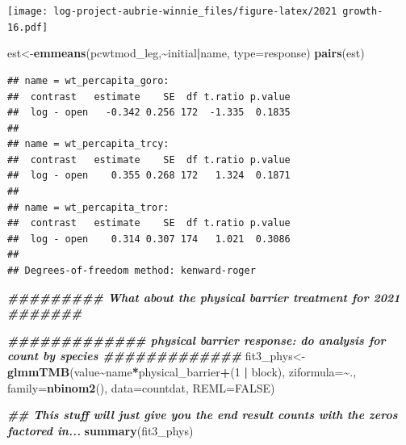 \documentclass[
]{article}
\newenvironment{Shaded}{\begin{snugshade}}{\end{snugshade}}
\newcommand{\AttributeTok}[1]{\textcolor[rgb]{0.13,0.29,0.53}{#1}}
\newcommand{\ConstantTok}[1]{\textcolor[rgb]{0.56,0.35,0.01}{#1}}
\newcommand{\DecValTok}[1]{\textcolor[rgb]{0.00,0.00,0.81}{#1}}
\newcommand{\DocumentationTok}[1]{\textcolor[rgb]{0.56,0.35,0.01}{\textbf{\textit{#1}}}}
\newcommand{\FunctionTok}[1]{\textcolor[rgb]{0.13,0.29,0.53}{\textbf{#1}}}
\newcommand{\NormalTok}[1]{#1}
\newcommand{\OtherTok}[1]{\textcolor[rgb]{0.56,0.35,0.01}{#1}}
\newcommand{\SpecialCharTok}[1]{\textcolor[rgb]{0.81,0.36,0.00}{\textbf{#1}}}
\newcommand{\StringTok}[1]{\textcolor[rgb]{0.31,0.60,0.02}{#1}}
\begin{document}
\texttt{[image: log-project-aubrie-winnie\_files/figure-latex/2021 growth-16.pdf]}

\begin{Shaded}
\begin{Highlighting}[]
\NormalTok{est}\OtherTok{\textless{}{-}}\FunctionTok{emmeans}\NormalTok{(pcwtmod\_leg,}\SpecialCharTok{\textasciitilde{}}\NormalTok{initial}\SpecialCharTok{|}\NormalTok{name, }\AttributeTok{type=}\StringTok{\textquotesingle{}response\textquotesingle{}}\NormalTok{)}
\FunctionTok{pairs}\NormalTok{(est)}
\end{Highlighting}
\end{Shaded}

\begin{verbatim}
## name = wt_percapita_goro:
##  contrast   estimate    SE  df t.ratio p.value
##  log - open   -0.342 0.256 172  -1.335  0.1835
## 
## name = wt_percapita_trcy:
##  contrast   estimate    SE  df t.ratio p.value
##  log - open    0.355 0.268 172   1.324  0.1871
## 
## name = wt_percapita_tror:
##  contrast   estimate    SE  df t.ratio p.value
##  log - open    0.314 0.307 174   1.021  0.3086
## 
## Degrees-of-freedom method: kenward-roger
\end{verbatim}

\begin{Shaded}
\begin{Highlighting}[]
\DocumentationTok{\#\#\#\#\#\#\#\#\# What about the physical barrier treatment for 2021 \#\#\#\#\#\#\#}

\DocumentationTok{\#\#\#\#\#\#\#\#\#\#\#\#\# physical barrier response: do analysis for count by species \#\#\#\#\#\#\#\#\#\#\#\#\# }
\NormalTok{fit3\_phys}\OtherTok{\textless{}{-}}\FunctionTok{glmmTMB}\NormalTok{(value}\SpecialCharTok{\textasciitilde{}}\NormalTok{name}\SpecialCharTok{*}\NormalTok{physical\_barrier}\SpecialCharTok{+}\NormalTok{(}\DecValTok{1} \SpecialCharTok{|}\NormalTok{ block), }\AttributeTok{ziformula=}\SpecialCharTok{\textasciitilde{}}\NormalTok{., }\AttributeTok{family=}\FunctionTok{nbinom2}\NormalTok{(), }\AttributeTok{data=}\NormalTok{countdat, }\AttributeTok{REML=}\ConstantTok{FALSE}\NormalTok{)}

\DocumentationTok{\#\# This stuff will just give you the end result counts with the zeros factored in...}
\FunctionTok{summary}\NormalTok{(fit3\_phys)}
\end{Highlighting}
\end{Shaded}
\end{document}
